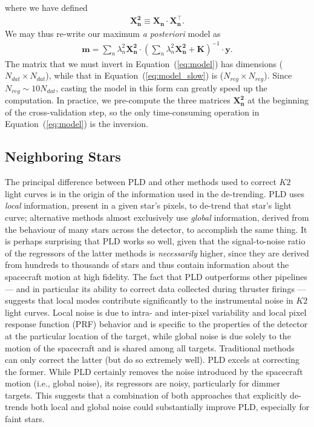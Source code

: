 \documentclass[]{emulateapj}
\begin{document}
%
where we have defined
%
\begin{align}
\label{eq:x2}
\mathbf{X^2_n} \equiv \mathbf{X_n} \cdot \mathbf{X^\top_n}.
\end{align}
%
We may thus re-write our maximum \emph{a posteriori} model as
%
\begin{align}
\label{eq:model}
\mathbf{m} = \sum_n \lambda_n^2 \mathbf{X^2_n}
                  \cdot
                  \left(
                  \sum_n \lambda_n^2 \mathbf{X^2_n} + \mathbf{K}
                  \right)^{-1} 
                  \cdot
                  \mathbf{y}.
\end{align}
%
The matrix that we must invert in Equation~(\ref{eq:model}) has dimensions ($N_{dat} \times N_{dat}$),
while that in Equation~(\ref{eq:model_slow}) is ($N_{reg} \times N_{reg}$). Since
$N_{reg} \sim 10N_{dat}$, casting the model in this form can greatly speed up the
computation. In practice, we pre-compute the three matrices $\mathbf{X^2_n}$ at the beginning
of the cross-validation step, so the only time-consuming operation in Equation~(\ref{eq:model})
is the inversion.

\subsection{Neighboring Stars}
\label{sec:neighboring}
The principal difference between PLD and other methods used to correct $K2$ light curves
\citep[e.g.,][]{Vanderburg14,ForemanMackey15,Aigrain16} is in the origin of the information
used in the de-trending. PLD uses \emph{local} information, present in a given star's pixels,
to de-trend that star's light curve; alternative methods almost exclusively use \emph{global} information,
derived from the behaviour of many stars across the detector, to accomplish the same thing. 
It is perhaps surprising that PLD works so well, given that the signal-to-noise ratio of the regressors
of the latter methods is \emph{necessarily} higher, since they are derived from hundreds to
thousands of stars and thus contain information about the spacecraft motion at high fidelity.
The fact that PLD outperforms other pipelines --- and in particular its ability to correct
data collected during thruster firings --- suggests that local modes contribute significantly
to the instrumental noise in $K2$ light curves. Local noise is due to intra- and inter-pixel
variability and local pixel response function (PRF) behavior and is specific to the properties of 
the detector at the particular location of the target, while global noise is due solely to 
the motion of the spacecraft and is shared among all targets. Traditional methods can only
correct the latter (but do so extremely well). PLD excels at correcting the former. While
PLD certainly removes the noise introduced by the spacecraft motion (i.e., global noise), its
regressors are noisy, particularly for dimmer targets. This suggests that a combination of
both approaches that explicitly de-trends both local and global noise could substantially improve PLD,
especially for faint stars.
\end{document}
